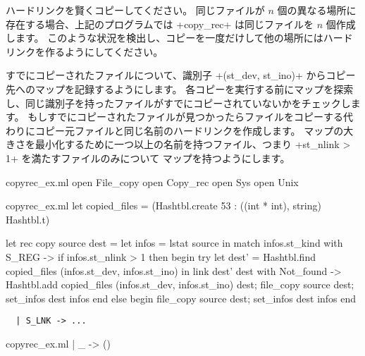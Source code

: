 \begin{exercise}
\label{ex/copyrec}
ハードリンクを賢くコピーしてください。
同じファイルが $n$ 個の異なる場所に存在する場合、上記のプログラムでは
\ml+copy_rec+ は同じファイルを $n$ 個作成します。
このような状況を検出し、コピーを一度だけして他の場所にはハードリンクを作るようにしてください。
\end{exercise}

\begin{answer}
すでにコピーされたファイルについて、識別子 \ml+(st_dev, st_ino)+ からコピー先へのマップを記録するようにします。
各コピーを実行する前にマップを探索し、同じ識別子を持ったファイルがすでにコピーされていないかをチェックします。
もしすでにコピーされたファイルが見つかったらファイルをコピーする代わりにコピー元ファイルと同じ名前のハードリンクを作成します。
マップの大きさを最小化するために一つ以上の名前を持つファイル、つまり \ml+st_nlink > 1+ を満たすファイルのみについて
マップを持つようにします。
%
\begin{codefile}{copyrec_ex.ml}
open File_copy
open Copy_rec
open Sys
open Unix
\end{codefile}
%
\begin{listingcodefile}{copyrec_ex.ml}
let copied_files = (Hashtbl.create 53 : ((int * int), string) Hashtbl.t)

let rec copy source dest =
  let infos = lstat source in
  match infos.st_kind with
    S_REG ->
      if infos.st_nlink > 1 then begin
        try
          let dest' =
            Hashtbl.find copied_files (infos.st_dev, infos.st_ino)
          in link dest' dest
        with Not_found ->
          Hashtbl.add copied_files (infos.st_dev, infos.st_ino) dest;
          file_copy source dest;
          set_infos dest infos
      end else begin
        file_copy source dest;
        set_infos dest infos
      end
\end{listingcodefile}
\begin{lstlisting}
  | S_LNK -> ...
\end{lstlisting}
\begin{codefile}{copyrec_ex.ml}
| _ -> ()
\end{codefile}
\end{answer}


